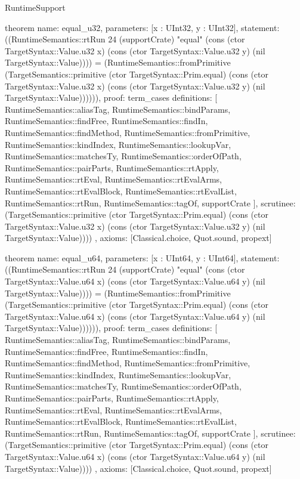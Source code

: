 \begin{lexlean}{RuntimeSupport}
\begin{semanticmodule}
theorem{
  name: equal_u32,
  parameters: [x : UInt32, y : UInt32],
  statement: ((RuntimeSemantics::rtRun 24 (supportCrate) "equal" (cons (ctor TargetSyntax::Value.u32 x) (cons (ctor TargetSyntax::Value.u32 y) (nil TargetSyntax::Value)))) = (RuntimeSemantics::fromPrimitive (TargetSemantics::primitive (ctor TargetSyntax::Prim.equal) (cons (ctor TargetSyntax::Value.u32 x) (cons (ctor TargetSyntax::Value.u32 y) (nil TargetSyntax::Value)))))),
  proof: term_cases{
    definitions: [
      RuntimeSemantics::aliasTag,
      RuntimeSemantics::bindParams,
      RuntimeSemantics::findFree,
      RuntimeSemantics::findIn,
      RuntimeSemantics::findMethod,
      RuntimeSemantics::fromPrimitive,
      RuntimeSemantics::kindIndex,
      RuntimeSemantics::lookupVar,
      RuntimeSemantics::matchesTy,
      RuntimeSemantics::orderOfPath,
      RuntimeSemantics::pairParts,
      RuntimeSemantics::rtApply,
      RuntimeSemantics::rtEval,
      RuntimeSemantics::rtEvalArms,
      RuntimeSemantics::rtEvalBlock,
      RuntimeSemantics::rtEvalList,
      RuntimeSemantics::rtRun,
      RuntimeSemantics::tagOf,
      supportCrate
    ],
    scrutinee: (TargetSemantics::primitive (ctor TargetSyntax::Prim.equal) (cons (ctor TargetSyntax::Value.u32 x) (cons (ctor TargetSyntax::Value.u32 y) (nil TargetSyntax::Value))))
  },
  axioms: [Classical.choice, Quot.sound, propext]
}

theorem{
  name: equal_u64,
  parameters: [x : UInt64, y : UInt64],
  statement: ((RuntimeSemantics::rtRun 24 (supportCrate) "equal" (cons (ctor TargetSyntax::Value.u64 x) (cons (ctor TargetSyntax::Value.u64 y) (nil TargetSyntax::Value)))) = (RuntimeSemantics::fromPrimitive (TargetSemantics::primitive (ctor TargetSyntax::Prim.equal) (cons (ctor TargetSyntax::Value.u64 x) (cons (ctor TargetSyntax::Value.u64 y) (nil TargetSyntax::Value)))))),
  proof: term_cases{
    definitions: [
      RuntimeSemantics::aliasTag,
      RuntimeSemantics::bindParams,
      RuntimeSemantics::findFree,
      RuntimeSemantics::findIn,
      RuntimeSemantics::findMethod,
      RuntimeSemantics::fromPrimitive,
      RuntimeSemantics::kindIndex,
      RuntimeSemantics::lookupVar,
      RuntimeSemantics::matchesTy,
      RuntimeSemantics::orderOfPath,
      RuntimeSemantics::pairParts,
      RuntimeSemantics::rtApply,
      RuntimeSemantics::rtEval,
      RuntimeSemantics::rtEvalArms,
      RuntimeSemantics::rtEvalBlock,
      RuntimeSemantics::rtEvalList,
      RuntimeSemantics::rtRun,
      RuntimeSemantics::tagOf,
      supportCrate
    ],
    scrutinee: (TargetSemantics::primitive (ctor TargetSyntax::Prim.equal) (cons (ctor TargetSyntax::Value.u64 x) (cons (ctor TargetSyntax::Value.u64 y) (nil TargetSyntax::Value))))
  },
  axioms: [Classical.choice, Quot.sound, propext]
}


\end{semanticmodule}
\end{lexlean}
